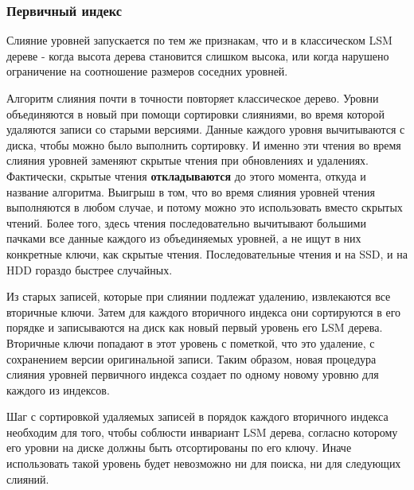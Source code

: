 \documentclass[a4paper,hidelinks,12pt]{article}
\begin{document}
\subsubsection{Первичный индекс}
Слияние уровней запускается по тем же признакам, что и в классическом LSM
дереве - когда высота дерева становится слишком высока, или когда нарушено
ограничение на соотношение размеров соседних уровней.

Алгоритм слияния почти в точности повторяет классическое дерево. Уровни
объединяются в новый при помощи сортировки слияниями, во время которой удаляются
записи со старыми версиями. Данные каждого уровня вычитываются с диска,
чтобы можно было выполнить сортировку. И именно эти чтения во время слияния
уровней заменяют скрытые чтения при обновлениях и удалениях. Фактически, скрытые
чтения \textbf {откладываются} до этого момента, откуда и название алгоритма.
Выигрыш в том, что во время слияния уровней чтения выполняются в любом случае,
и потому можно это использовать вместо скрытых чтений. Более того, здесь
чтения последовательно вычитывают большими пачками все данные каждого из
объединяемых уровней, а не ищут в них конкретные ключи, как скрытые чтения.
Последовательные чтения и на SSD, и на HDD гораздо быстрее случайных.

Из старых записей, которые при слиянии подлежат удалению, извлекаются все
вторичные ключи. Затем для каждого вторичного индекса они сортируются в его
порядке и записываются на диск как новый первый уровень его LSM дерева.
Вторичные ключи попадают в этот уровень с пометкой, что это удаление, с
сохранением версии оригинальной записи. Таким образом, новая процедура слияния
уровней первичного индекса создает по одному новому уровню для каждого из
индексов.

Шаг с сортировкой удаляемых записей в порядок каждого вторичного индекса
необходим для того, чтобы соблюсти инвариант LSM дерева, согласно которому
его уровни на диске должны быть отсортированы по его ключу. Иначе использовать
такой уровень будет невозможно ни для поиска, ни для следующих слияний.
\end{document}
